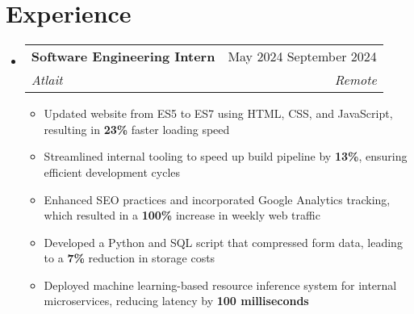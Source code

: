\documentclass[letterpaper, 11pt]{article}
\makeatletter
\newcommand{\resumeItem}[1]{
    \item \small {
        {#1 \vspace{-3pt}} %
    }
}
\newcommand{\resumeSubheading}[4]{ %
  \vspace{-2pt}\item
    \begin{tabular*}{0.99\textwidth}[t]{l@{\extracolsep{\fill}}r}
      \textbf{#1} & #2 \\
      \textit{\small#3} & \textit{\small #4} \\
    \end{tabular*}\vspace{-7pt}
}
\newcommand{\resumeSubHeadingListStart}{\begin{itemize}[leftmargin=0.15in, label={}]}
\newcommand{\resumeSubHeadingListEnd}{\end{itemize}}
\newcommand{\resumeItemListStart}{\begin{itemize}}
\newcommand{\resumeItemListEnd}{\end{itemize}\vspace{-10pt}}
\makeatother
\begin{document}
\vspace{-25pt}

\section{Experience}
    \resumeSubHeadingListStart{}
        \resumeSubheading %
        {Software Engineering Intern}{May 2024 \textendash{} September 2024}
        {Atlait}{Remote}
        \resumeItemListStart{}
            \resumeItem{Updated website from ES5 to ES7 using HTML, CSS, and JavaScript, resulting in \textbf{23\%} faster loading speed}
            \resumeItem{Streamlined internal tooling to speed up build pipeline by \textbf{13\%}, ensuring efficient development cycles}
            \resumeItem{Enhanced SEO practices and incorporated Google Analytics tracking, which resulted in a \textbf{100\%} increase in weekly web traffic}
            \resumeItem{Developed a Python and SQL script that compressed form data, leading to a \textbf{7\%} reduction in storage costs}
            \resumeItem{Deployed machine learning-based resource inference system for internal microservices, reducing latency by \textbf{100 milliseconds}}
        \resumeItemListEnd{}
    \resumeSubHeadingListEnd{}

\vspace{-27pt}

\end{document}
